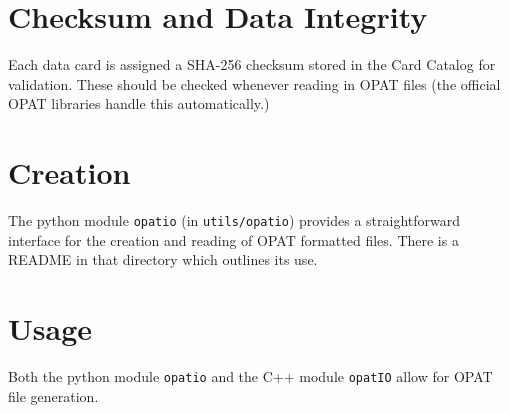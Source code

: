 \documentclass{article}
\begin{document}
\section{Checksum and Data Integrity}
Each data card is assigned a SHA-256 checksum stored in the Card Catalog for
validation.  These should be checked whenever reading in OPAT files (the
official OPAT libraries handle this automatically.) 

\section{Creation}
The python module \texttt{opatio} (in \texttt{utils/opatio}) provides
a straightforward interface for the creation and reading of OPAT formatted
files.  There is a README in that directory which outlines its use. 

\section{Usage}
Both the python module \texttt{opatio} and the C++ module \texttt{opatIO} allow for OPAT file generation. 
\end{document}

